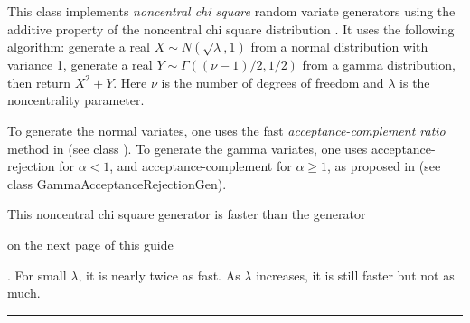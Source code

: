 
This class implements {\em noncentral chi square\/} random variate generators
using the additive property of the noncentral chi square distribution
\cite{tKRI06a}. It uses the following algorithm: generate a real
 $X \sim N(\sqrt\lambda, 1)$ from a normal distribution with variance 1,
generate a real $Y \sim \Gamma((\nu - 1)/2, 1/2)$ from a gamma distribution,
then return $X^2 + Y$. Here $\nu$ is the number of degrees of freedom and
$\lambda$ is the noncentrality parameter.

To generate the normal variates, one uses the fast
\emph{acceptance-complement ratio} method in \cite{rHOR90a}
(see class ).
To generate the gamma variates, one uses acceptance-rejection for $\alpha<1$,
and acceptance-complement for $\alpha\ge 1$, as proposed in \cite{rAHR72b,rAHR82a}
(see class 
{GammaAcceptanceRejectionGen}).

This noncentral chi square generator is faster than the generator
\begin{latexonly}on the next page of this guide\end{latexonly}.
For small $\lambda$, it is nearly twice as fast. As $\lambda$ increases,
it is still faster but not as much.


\bigskip\hrule

